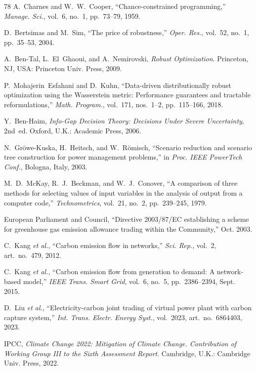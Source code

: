 \documentclass[journal]{IEEEtran}
\begin{document}
\begin{thebibliography}{78}
 A.~Charnes and W.~W.~Cooper, ``Chance-constrained programming,'' \textit{Manage. Sci.}, vol.~6, no.~1, pp.~73--79, 1959.

 D.~Bertsimas and M.~Sim, ``The price of robustness,'' \textit{Oper. Res.}, vol.~52, no.~1, pp.~35--53, 2004.

 A.~Ben-Tal, L.~El~Ghaoui, and A.~Nemirovski, \textit{Robust Optimization}. Princeton, NJ, USA: Princeton Univ. Press, 2009.

 P.~Mohajerin~Esfahani and D.~Kuhn, ``Data-driven distributionally robust optimization using the Wasserstein metric: Performance guarantees and tractable reformulations,'' \textit{Math. Program.}, vol.~171, nos.~1--2, pp.~115--166, 2018.

 Y.~Ben-Haim, \textit{Info-Gap Decision Theory: Decisions Under Severe Uncertainty}, 2nd~ed. Oxford, U.K.: Academic Press, 2006.

 N.~Gr\"{o}we-Kuska, H.~Heitsch, and W.~R\"{o}misch, ``Scenario reduction and scenario tree construction for power management problems,'' in \textit{Proc. IEEE PowerTech Conf.}, Bologna, Italy, 2003.

 M.~D.~McKay, R.~J.~Beckman, and W.~J.~Conover, ``A comparison of three methods for selecting values of input variables in the analysis of output from a computer code,'' \textit{Technometrics}, vol.~21, no.~2, pp.~239--245, 1979.

 European Parliament and Council, ``Directive 2003/87/EC establishing a scheme for greenhouse gas emission allowance trading within the Community,'' Oct. 2003.

 C.~Kang \textit{et al.}, ``Carbon emission flow in networks,'' \textit{Sci. Rep.}, vol.~2, art.~no.~479, 2012.

 C.~Kang \textit{et al.}, ``Carbon emission flow from generation to demand: A network-based model,'' \textit{IEEE Trans. Smart Grid}, vol.~6, no.~5, pp.~2386--2394, Sept. 2015.

 D.~Liu \textit{et al.}, ``Electricity-carbon joint trading of virtual power plant with carbon capture system,'' \textit{Int. Trans. Electr. Energy Syst.}, vol.~2023, art.~no.~6864403, 2023.

 IPCC, \textit{Climate Change 2022: Mitigation of Climate Change. Contribution of Working Group III to the Sixth Assessment Report}. Cambridge, U.K.: Cambridge Univ. Press, 2022.


\end{thebibliography}
\end{document}
